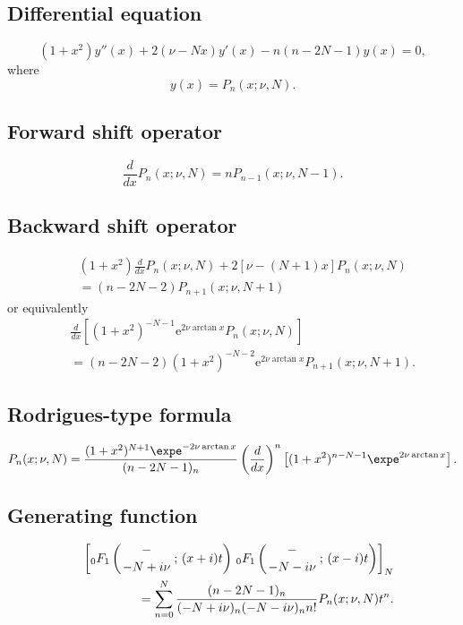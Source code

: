 \documentclass[envcountchap,graybox]{svmono}
\newcommand{\hyp}[5]{\mbox{}_{#1}{F}_{#2}
\left(\genfrac{}{}{0pt}{}{#3}{#4}\,;\,#5\right)}
\newcommand{\e}{\textrm{e}}
\newcommand{\hyp}[5]{\,\mbox{}_{#1}F_{#2}\!\left(
  \genfrac{}{}{0pt}{}{#3}{#4};#5\right)}
\begin{document}
\subsection*{Differential equation}
\begin{equation}
\label{dvPseudoJacobi}
(1+x^2)y''(x)+2\left(\nu-Nx\right)y'(x)-n(n-2N-1)y(x)=0,
\end{equation}
where
$$y(x)=P_n(x;\nu,N).$$

\subsection*{Forward shift operator}
\begin{equation}
\label{shift1PseudoJacobi}
\frac{d}{dx}P_n(x;\nu,N)=nP_{n-1}(x;\nu,N-1).
\end{equation}

\subsection*{Backward shift operator}
\begin{eqnarray}
\label{shift2PseudoJacobiI}
& &(1+x^2)\frac{d}{dx}P_n(x;\nu,N)+2\left[\nu-(N+1)x\right]P_n(x;\nu,N)\nonumber\\
& &{}=(n-2N-2)P_{n+1}(x;\nu,N+1)
\end{eqnarray}
or equivalently
\begin{eqnarray}
\label{shift2PseudoJacobiII}
& &\frac{d}{dx}\left[(1+x^2)^{-N-1}\e^{2\nu\arctan x}P_n(x;\nu,N)\right]\nonumber\\
& &{}=(n-2N-2)(1+x^2)^{-N-2}\e^{2\nu\arctan x}P_{n+1}(x;\nu,N+1).
\end{eqnarray}

\subsection*{Rodrigues-type formula}
\begin{equation}
\label{RodPseudoJacobi}
P_n(x;\nu,N)=\frac{(1+x^2)^{N+1}\expe^{-2\nu\arctan x}}{(n-2N-1)_n}
\left(\frac{d}{dx}\right)^n\left[(1+x^2)^{n-N-1}\expe^{2\nu\arctan x}\right].
\end{equation}

\subsection*{Generating function}
\begin{eqnarray}
\label{GenPseudoJacobi}
& &\left[\hyp{0}{1}{-}{-N+i\nu}{(x+i)t}\,\hyp{0}{1}{-}{-N-i\nu}{(x-i)t}\right]_N\nonumber\\
& &{}=\sum_{n=0}^N\frac{(n-2N-1)_n}{(-N+i\nu)_n(-N-i\nu)_nn!}P_n(x;\nu,N)t^n.
\end{eqnarray}
\end{document}
